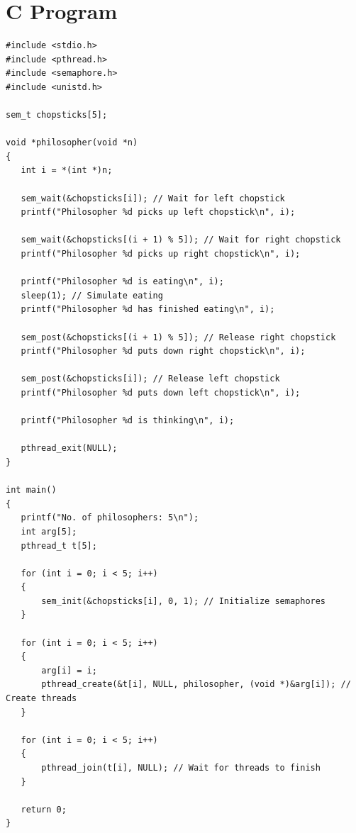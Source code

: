 \section{C Program}
\begin{lstlisting}[label={list:c_program:queue}]
#include <stdio.h>
#include <pthread.h>
#include <semaphore.h>
#include <unistd.h>

sem_t chopsticks[5];

void *philosopher(void *n)
{
   int i = *(int *)n;

   sem_wait(&chopsticks[i]); // Wait for left chopstick
   printf("Philosopher %d picks up left chopstick\n", i);

   sem_wait(&chopsticks[(i + 1) % 5]); // Wait for right chopstick
   printf("Philosopher %d picks up right chopstick\n", i);

   printf("Philosopher %d is eating\n", i);
   sleep(1); // Simulate eating
   printf("Philosopher %d has finished eating\n", i);

   sem_post(&chopsticks[(i + 1) % 5]); // Release right chopstick
   printf("Philosopher %d puts down right chopstick\n", i);

   sem_post(&chopsticks[i]); // Release left chopstick
   printf("Philosopher %d puts down left chopstick\n", i);

   printf("Philosopher %d is thinking\n", i);

   pthread_exit(NULL);
}

int main()
{
   printf("No. of philosophers: 5\n");
   int arg[5];
   pthread_t t[5];

   for (int i = 0; i < 5; i++)
   {
       sem_init(&chopsticks[i], 0, 1); // Initialize semaphores
   }

   for (int i = 0; i < 5; i++)
   {
       arg[i] = i;
       pthread_create(&t[i], NULL, philosopher, (void *)&arg[i]); // Create threads
   }

   for (int i = 0; i < 5; i++)
   {
       pthread_join(t[i], NULL); // Wait for threads to finish
   }

   return 0;
}
\end{lstlisting}

